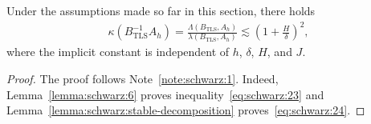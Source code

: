 \begin{theorem}
  \label{theorem:schwarz:two-level-convergence}
  Under the assumptions made so far in this section, there holds
  \begin{gather}
    \label{eq:schwarz:14}
    \kappa(B^{-1}_{\text{TLS}} A_h)
    = \frac{\Lambda(B_{\text{TLS}}, A_h)}{\lambda(B_{\text{TLS}},
      A_h)}
    \lesssim \left(1+\frac H\delta\right)^2,
  \end{gather}
  where the implicit constant is independent of $h$, $\delta$, $H$, and $J$.
\end{theorem}

\begin{proof}
  The proof follows Note~\ref{note:schwarz:1}. Indeed,
  Lemma~\ref{lemma:schwarz:6} proves inequality~\eqref{eq:schwarz:23}
  and Lemma~\ref{lemma:schwarz:stable-decomposition}
  proves~\eqref{eq:schwarz:24}.
\end{proof}

